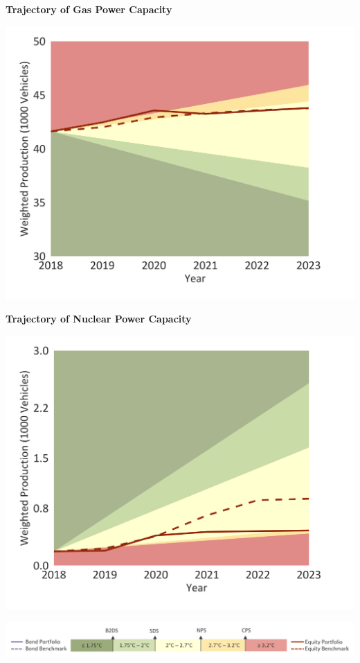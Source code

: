 \documentclass[10pt,table,a4]{article}\usepackage[]{graphicx}\usepackage[]{color}
\begin{document}
	\begin{minipage}[t]{.49\textwidth}
		\textbf{Trajectory of Gas Power Capacity }
		
		\includegraphics[trim = {0 0cm 0 0},width=1\linewidth]{CAFigures/Fig24}
		
		\textbf{Trajectory of Nuclear Power Capacity }
		
		\includegraphics[trim = {0 0cm 0 0},width=1\linewidth]{CAFigures/Fig25}
		
	\end{minipage}
	
	\vspace{-0.6cm}
	\begin{center}
		\includegraphics[trim = {0 0cm 0 0},width=.9\linewidth]{ReportGraphics/246Legend.png}
	\end{center}
	
\end{document}
